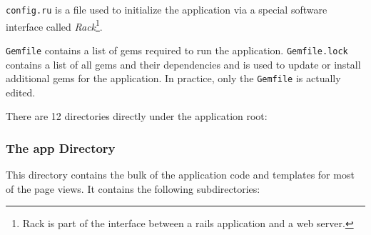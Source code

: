 \documentclass[12pt,twoside]{article}
\begin{document}
\verb=config.ru= is a file used to initialize the application via a
special software interface called \emph{Rack}\footnote{Rack is part
of the interface between a rails application and a web server.}.

\verb=Gemfile= contains a list of gems required to run the application.
\verb=Gemfile.lock= contains a list of all gems and their dependencies
and is used to update or install additional gems for the application.
In practice, only the \verb=Gemfile= is actually edited.

There are 12 directories directly under the application root:
\subsubsection{The app Directory}
This directory contains the bulk of the application code and templates 
for most of the page views. It contains the following subdirectories:
\end{document}
